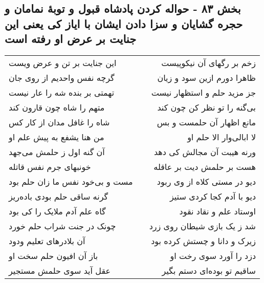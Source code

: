 \begin{center}
\section*{بخش ۸۳ - حواله کردن پادشاه قبول و توبهٔ نمامان و حجره گشایان و سزا دادن ایشان با ایاز کی یعنی این جنایت بر عرض او رفته است}
\label{sec:sh083}
\begin{longtable}{l p{0.5cm} r}
این جنایت بر تن و عرض ویست
&&
زخم بر رگهای آن نیکوپیست
\\
گرچه نفس واحدیم از روی جان
&&
ظاهرا دورم ازین سود و زیان
\\
تهمتی بر بنده شه را عار نیست
&&
جز مزید حلم و استظهار نیست
\\
متهم را شاه چون قارون کند
&&
بی‌گنه را تو نظر کن چون کند
\\
شاه را غافل مدان از کار کس
&&
مانع اظهار آن حلمست و بس
\\
من هنا یشفع به پیش علم او
&&
لا ابالی‌وار الا حلم او
\\
آن گنه اول ز حلمش می‌جهد
&&
ورنه هیبت آن مجالش کی دهد
\\
خونبهای جرم نفس قاتله
&&
هست بر حلمش دیت بر عاقله
\\
مست و بی‌خود نفس ما زان حلم بود
&&
دیو در مستی کلاه از وی ربود
\\
گرنه ساقی حلم بودی باده‌ریز
&&
دیو با آدم کجا کردی ستیز
\\
گاه علم آدم ملایک را کی بود
&&
اوستاد علم و نقاد نقود
\\
چونک در جنت شراب حلم خورد
&&
شد ز یک بازی شیطان روی زرد
\\
آن بلادرهای تعلیم ودود
&&
زیرک و دانا و چستش کرده بود
\\
باز آن افیون حلم سخت او
&&
دزد را آورد سوی رخت او
\\
عقل آید سوی حلمش مستجیر
&&
ساقیم تو بوده‌ای دستم بگیر
\\
\end{longtable}
\end{center}
